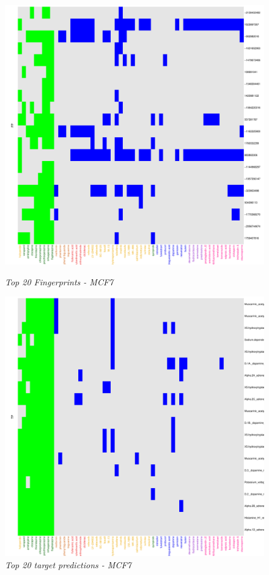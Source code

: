 \documentclass[a4paper]{article}
\begin{document}
\begin{figure}[H]
  \begin{minipage}[b]{.5\linewidth}
     \centering
\includegraphics{IntClustVignette-FeaturesPlotFP}
\caption{{\it Top 20 Fingerprints - MCF7}\label{MCF7_F}}
\end{minipage}%
  \begin{minipage}[b]{.5\linewidth}
     \centering
\includegraphics{IntClustVignette-FeaturesPlotT}
\caption{{\it Top 20 target predictions - MCF7}\label{MCF7_F}}
\end{minipage}
\end{figure}
\newpage


\newpage
\end{document}

